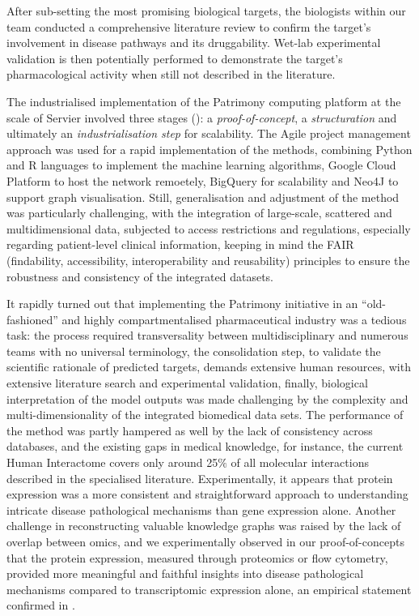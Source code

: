 After sub-setting the most promising biological targets, the biologists within our team conducted a comprehensive literature review to confirm the target's involvement in disease pathways and its druggability. Wet-lab experimental validation is then potentially performed to demonstrate the target's pharmacological activity when still not described in the literature.


The industrialised implementation of the Patrimony computing platform at the scale of Servier involved three stages (): a \emph{proof-of-concept}, a \emph{structuration} and ultimately an \emph{industrialisation step} for scalability. The Agile project management approach \autocite{steinberg_etal15} was used for a rapid implementation of the methods, combining Python and R languages to implement the machine learning algorithms, Google Cloud Platform to host the network remoetely, BigQuery for scalability and Neo4J \autocite{lopez_cruz15} to support graph visualisation. Still, generalisation and adjustment of the method was particularly challenging, with the integration of large-scale, scattered and multidimensional data, subjected to access restrictions and regulations, especially regarding patient-level clinical information, keeping in mind the FAIR (findability, accessibility, interoperability and reusability) principles \autocite{wilkinson_etal16} to ensure the robustness and consistency of the integrated datasets. 

It rapidly turned out that implementing the Patrimony initiative in an \enquote {old-fashioned} and highly compartmentalised pharmaceutical industry was a tedious task: the process required transversality between multidisciplinary and numerous teams with no universal terminology, the consolidation step, to validate the scientific rationale of predicted targets, demands extensive human resources, with extensive literature search and experimental validation, finally, biological interpretation of the model outputs was made challenging by the complexity and multi-dimensionality of the integrated biomedical data sets. The performance of the method was partly hampered as well by the lack of consistency across databases, and the existing gaps in medical knowledge, for instance, the current Human Interactome \autocite{menche_etal15} covers only around 25$\%$ of all molecular interactions described in the specialised literature. Experimentally, it appears that protein expression was a more consistent and straightforward approach to understanding intricate disease pathological mechanisms than gene expression alone. Another challenge in reconstructing valuable knowledge graphs was raised by the lack of overlap between omics, and we experimentally observed in our proof-of-concepts that the protein expression, measured through proteomics or flow cytometry, provided more meaningful and faithful insights into disease pathological mechanisms compared to transcriptomic expression alone, an empirical statement confirmed in \autocite{meissner_etal13}.


